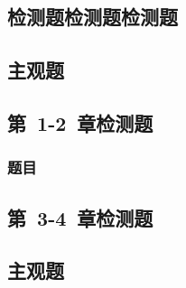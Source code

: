 \documentclass[color=COLORFUL]{textbook-cn}%
\begin{document}
\begin{Quiz}
\chapter{检测题检测题检测题}


\section{主观题}
\end{Quiz}






\begin{Test}
\chapter{第~1-2~章检测题}
\lipsum\lipsum\cite{7}\cite{6}
\subsection{题目}
\end{Test}

\begin{Quiz}
\chapter{第~3-4~章检测题}
\section{主观题}
\end{Quiz}



\tcbstoprecording
\end{document}
